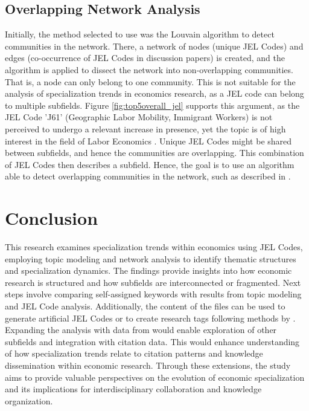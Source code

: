 \documentclass[11pt, a4paper, leqno]{article}
\begin{document}
\subsection{Overlapping Network Analysis}
Initially, the method selected to use was the Louvain algorithm to detect communities in the network.
There, a network of nodes (unique JEL Codes) and edges (co-occurrence of JEL Codes in discussion papers) is created, and the algorithm is applied to dissect the network into non-overlapping communities.
That is, a node can only belong to one community.
This is not suitable for the analysis of specialization trends in economics research, as a JEL code can belong to multiple subfields.
Figure \ref{fig:top5overall_jel} supports this argument, as the JEL Code 'J61' (Geographic Labor Mobility, Immigrant Workers) is not perceived to undergo a relevant increase in presence, yet the topic is of high interest in the field of Labor Economics \citep{fasani2020}.
Unique JEL Codes might be shared between subfields, and hence the communities are overlapping.
This combination of JEL Codes then describes a subfield.
Hence, the goal is to use an algorithm able to detect overlapping communities in the network, such as described in \citet{yang2013}.

\section{Conclusion}
This research examines specialization trends within economics using JEL Codes, employing topic modeling and network analysis to identify thematic structures and specialization dynamics. The findings provide insights into how economic research is structured and how subfields are interconnected or fragmented.
Next steps involve comparing self-assigned keywords with results from topic modeling and JEL Code analysis. Additionally, the content of the files can be used to generate artificial JEL Codes \citep{heikkila2024} or to create research tags following methods by \citet{anauati2016, galiani2023a}.
Expanding the analysis with data from \citet{anauati2016, galiani2023a} would enable exploration of other subfields and integration with citation data. This would enhance understanding of how specialization trends relate to citation patterns and knowledge dissemination within economic research.
Through these extensions, the study aims to provide valuable perspectives on the evolution of economic specialization and its implications for interdisciplinary collaboration and knowledge organization.
\clearpage
\end{document}
